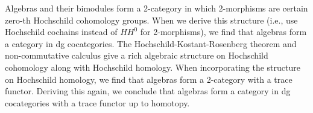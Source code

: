 Algebras and their bimodules form a 2-category in which 2-morphisms are certain zero-th Hochschild cohomology groups. When we derive this structure (i.e., use Hochschild cochains instead of $HH^0$ for 2-morphisms), we find that algebras form a category in dg cocategories. The Hochschild-Kostant-Rosenberg theorem and non-commutative calculus give a rich algebraic structure on Hochschild cohomology along with Hochschild homology. When incorporating the structure on Hochschild homology, we find that algebras form a 2-category with a trace functor. Deriving this again, we conclude that algebras form a category in dg cocategories with a trace functor up to homotopy. 